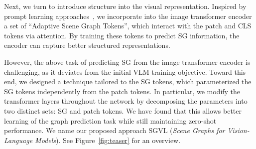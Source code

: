 \documentclass[11pt]{article}
\newcommand{\smodel}{SGVL}
\begin{document}
Next, we turn to introduce structure into the visual representation. Inspired by prompt learning approaches~\cite{Jia2022VisualPT,Herzig2022PromptonomyViT,Zhou2022ConditionalPL}, we incorporate into the image transformer encoder a set of ``Adaptive Scene Graph Tokens'', which interact with the patch and CLS tokens via attention. By training these tokens to predict SG information, the encoder can capture better structured representations.
















However, the above task of predicting SG from the image transformer encoder is challenging, as it deviates from the initial VLM training objective. Toward this end, we designed a technique tailored to the SG tokens, which parameterized the SG tokens independently from the patch tokens. In particular, we modify the transformer layers throughout the network by decomposing the parameters into two distinct sets: SG and patch tokens. We have found that this allows better learning of the graph prediction task while still maintaining zero-shot performance.  We name our proposed approach {\smodel} (\emph{Scene Graphs for Vision-Language Models}). See Figure~\ref{fig:teaser} for an overview. 
\end{document}
